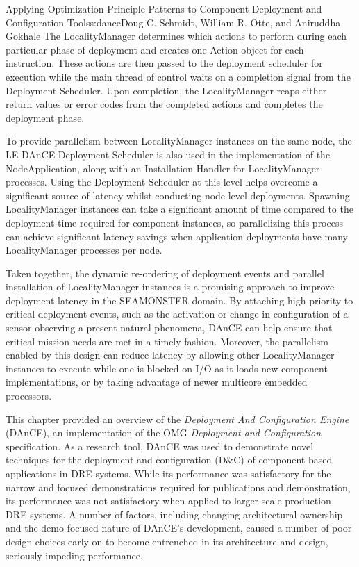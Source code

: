 \begin{aosachapter}{Applying Optimization Principle Patterns to Component Deployment and
                    Configuration Tools}{s:dance}{Doug C. Schmidt, William R. Otte, and Aniruddha Gokhale}
The LocalityManager determines which actions to perform during each
particular phase of deployment and creates one Action object for each
instruction. These actions are then passed to the deployment scheduler
for execution while the main thread of control waits on a completion
signal from the Deployment Scheduler. Upon completion, the
LocalityManager reaps either return values or error codes from the
completed actions and completes the deployment phase.

To provide parallelism between LocalityManager instances on the same
node, the LE-DAnCE Deployment Scheduler is also used in the
implementation of the NodeApplication, along with an Installation
Handler for LocalityManager processes. Using the Deployment Scheduler at
this level helps overcome a significant source of latency whilst
conducting node-level deployments. Spawning LocalityManager instances
can take a significant amount of time compared to the deployment time
required for component instances, so parallelizing this process can
achieve significant latency savings when application deployments have
many LocalityManager processes per node.

Taken together, the dynamic re-ordering of deployment events and
parallel installation of LocalityManager instances is a promising
approach to improve deployment latency in the SEAMONSTER domain. By
attaching high priority to critical deployment events, such as the
activation or change in configuration of a sensor observing a present
natural phenomena, DAnCE can help ensure that critical mission needs are
met in a timely fashion. Moreover, the parallelism enabled by this
design can reduce latency by allowing other LocalityManager instances to
execute while one is blocked on I/O as it loads new component
implementations, or by taking advantage of newer multicore embedded
processors.


\label{sec.conc}

This chapter provided an overview of the \emph{Deployment And
Configuration Engine} (DAnCE), an implementation of the OMG
\emph{Deployment and Configuration} specification. As a research tool,
DAnCE was used to demonstrate novel techniques for the deployment and
configuration (D\&C) of component-based applications in DRE systems.
While its performance was satisfactory for the narrow and focused
demonstrations required for publications and demonstration, its
performance was not satisfactory when applied to larger-scale production
DRE systems. A number of factors, including changing architectural
ownership and the demo-focused nature of DAnCE's development, caused a
number of poor design choices early on to become entrenched in its
architecture and design, seriously impeding performance.


\end{aosachapter}
